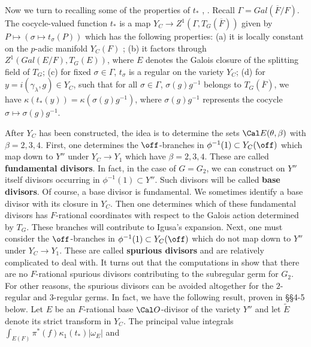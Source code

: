 Now we turn to recalling some of the properties of $t_*$ \cite{L},
\cite{H1}. Recall $\Gamma=Gal(\overline{F}/F)$.
The cocycle-valued function $t_*$ is a map
$Y_C\rightarrow Z^1(\Gamma, T_G(\overline{F}))$ given by
$P\longmapsto (\sigma\longmapsto t_\sigma(P))$
which has the following properties:
\newline
(a) it is locally constant on the $p$-adic manifold $Y_C(F)$ \cite{L};
\newline
(b) it factors through $Z^1(Gal(E/F), T_G(E))$,
where $E$ denotes the Galois closure of the splitting
field of $T_G$;
\newline
(c) for fixed $\sigma\in \Gamma$, $t_\sigma$ is a regular on the variety
$Y_C$;
\newline
(d) for $y=i(\gamma_\lambda ,g)\in Y_C$, such that for all
$\sigma\in \Gamma$,  
$\sigma(g)g^{-1}$ belongs to $T_G(\overline{F})$, we have
$\kappa (t_*(y))=\kappa(\sigma(g)g^{-1})$, where
$\sigma(g)g^{-1}$ represents
the cocycle $\sigma\longmapsto \sigma(g)g^{-1}$. 
\par
After $Y_C$ has been constructed, the idea is to determine the sets
${\Cal E}(\theta, \beta)$ with $\beta =2,3,4$. First,
one determines the $\off$-branches in $\phi^{-1}(1)\subset Y_C(\off)$ which
map down to $Y''$ under $Y_C\rightarrow Y_1$ which have
$\beta =2,3,4$. These are called {\bf fundamental divisors}.
In fact, in the case of $G=G_2$, we can construct on $Y''$ itself
divisors occurring in $\phi^{-1}(1)\subset Y''$.
Such divisors will be called {\bf base divisors}.
Of course, a base divisor is fundamental. 
We sometimes identify a base divisor with its closure in $Y_C$.
Then one determines which of these fundamental divisors
has $F$-rational
coordinates with respect to the Galois action determined by $T_G$.
These branches will contribute to Igusa's
expansion. Next, one must consider the $\off$-branches in 
$\phi^{-1}(1)\subset Y_C(\off)$ which do not
map down to $Y''$ under $Y_C\rightarrow Y_1$. These are 
called {\bf spurious divisors} and are relatively complicated to deal with. 
It turns
out that the computations in \cite{H1, Ch III} show that there are 
no $F$-rational spurious divisors contributing to the subregular germ
for $G_2$. For other reasons, the spurious divisors can be avoided
altogether for the $2$-regular and $3$-regular germs.
In fact, we have the following result, proven in \S\S 4-5 below.
 Let $E$ be an $F$-rational 
base ${\Cal O}$-divisor of the 
variety $Y''$ and let $\tilde{E}$ denote its strict transform
in $Y_C$. The principal
value integrals $\int_{{E}(F)}\pi^*(f)\kappa_1(t_*) |\omega_{{E}}|$ and
